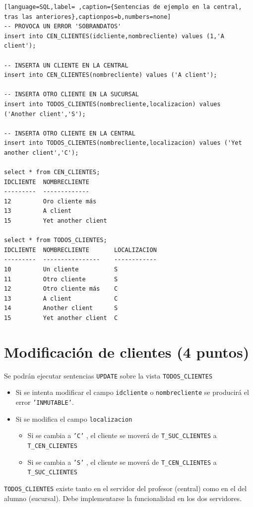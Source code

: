 \documentclass[a4paper]{article}
\begin{document}
\begin{lstlisting}[language=SQL,label= ,caption={Sentencias de ejemplo en la central, tras las anteriores},captionpos=b,numbers=none]
-- PROVOCA UN ERROR 'SOBRANDATOS'
insert into CEN_CLIENTES(idcliente,nombrecliente) values (1,'A client');

-- INSERTA UN CLIENTE EN LA CENTRAL
insert into CEN_CLIENTES(nombrecliente) values ('A client');

-- INSERTA OTRO CLIENTE EN LA SUCURSAL
insert into TODOS_CLIENTES(nombrecliente,localizacion) values ('Another client','S');

-- INSERTA OTRO CLIENTE EN LA CENTRAL
insert into TODOS_CLIENTES(nombrecliente,localizacion) values ('Yet another client','C');

select * from CEN_CLIENTES;
IDCLIENTE  NOMBRECLIENTE
---------  -------------
12         Oro cliente más
13         A client
15         Yet another client

select * from TODOS_CLIENTES;
IDCLIENTE  NOMBRECLIENTE       LOCALIZACION
---------  ----------------    ------------
10         Un cliente          S
11         Otro cliente        S
12         Otro cliente más    C
13         A client            C
14         Another client      S
15         Yet another client  C
\end{lstlisting}

\section{Modificación de clientes (4 puntos)}
\label{sec:org0000018}
Se podrán ejecutar sentencias \texttt{UPDATE} sobre la vista \texttt{TODOS\_CLIENTES}
\begin{itemize}
\item Si se intenta modificar el campo \texttt{idcliente} o \texttt{nombrecliente} se producirá el error \texttt{'INMUTABLE'}.
\item Si se modifica el campo \texttt{localizacion}
\begin{itemize}
\item Si se cambia a \texttt{'C'} , el cliente se moverá de \texttt{T\_SUC\_CLIENTES} a \texttt{T\_CEN\_CLIENTES}
\item Si se cambia a \texttt{'S'} , el cliente se moverá de \texttt{T\_CEN\_CLIENTES} a \texttt{T\_SUC\_CLIENTES}
\end{itemize}
\end{itemize}

\begin{Aviso}
\texttt{TODOS\_CLIENTES} existe tanto en el servidor del profesor (central)  como en el del alumno (sucursal). Debe implementarse la funcionalidad en los dos servidores.
\end{Aviso}
\end{document}
